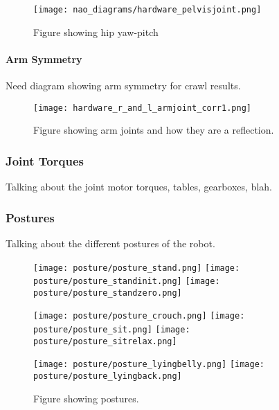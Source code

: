 \begin{figure}
\centering
\texttt{[image: nao\_diagrams/hardware\_pelvisjoint.png]}
\caption{Figure showing hip yaw-pitch}
\label{fig:nao_hip_yawpitch1}
\end{figure}

\paragraph{Arm Symmetry}
Need diagram showing arm symmetry for crawl results. 

\begin{figure}
\centering
\texttt{[image: hardware\_r\_and\_l\_armjoint\_corr1.png]}
\caption{Figure showing arm joints and how they are a reflection.}
\label{fig:nao_arm_joints_reflect1}
\end{figure}

\FloatBarrier

\subsubsection{Joint Torques}
Talking about the joint motor torques, tables, gearboxes, blah.

\subsubsection{Postures}
Talking about the different postures of the robot.

\begin{figure}
\centerline{\texttt{[image: posture/posture\_stand.png]}
            \texttt{[image: posture/posture\_standinit.png]}
            \texttt{[image: posture/posture\_standzero.png]}
}
\vspace*{0.05in}
\centerline{\texttt{[image: posture/posture\_crouch.png]}
            \texttt{[image: posture/posture\_sit.png]}
            \texttt{[image: posture/posture\_sitrelax.png]}
}
\vspace*{0.05in}
\centerline{\texttt{[image: posture/posture\_lyingbelly.png]}
            \texttt{[image: posture/posture\_lyingback.png]}
}
\caption{Figure showing postures.}
\label{fig:nao_postures1}
\end{figure}
